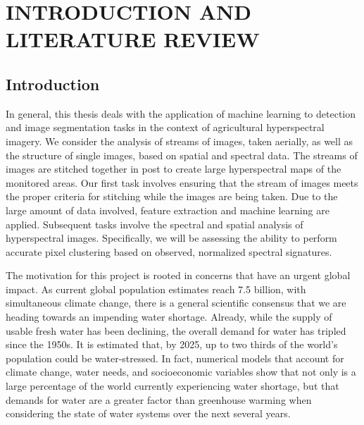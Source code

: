 %
%
%



\pagestyle{plain} %
\setcounter{page}{1}


\chapter{\uppercase {Introduction and Literature Review}}

\section{Introduction}

In general, this thesis deals with the application of machine learning to detection and image segmentation tasks in the context of agricultural hyperspectral imagery.
We consider the analysis of streams of images, taken aerially, as well as the structure of single images, based on spatial and spectral data.
The streams of images are stitched together in post to create large hyperspectral maps of the monitored areas.
Our first task involves ensuring that the stream of images meets the proper criteria for stitching while the images are being taken.
Due to the large amount of data involved, feature extraction and machine learning are applied.
Subsequent tasks involve the spectral and spatial analysis of hyperspectral images.
Specifically, we will be assessing the ability to perform accurate pixel clustering based on observed, normalized spectral signatures.

The motivation for this project is rooted in concerns that have an urgent global impact.
As current global population estimates reach 7.5 billion, with simultaneous climate change, there is a general scientific consensus that we are heading towards an impending water shortage.
Already, while the supply of usable fresh water has been declining, the overall demand for water has tripled since the 1950s.
It is estimated that, by 2025, up to two thirds of the world's population could be water-stressed.
In fact, numerical models that account for climate change, water needs, and socioeconomic variables show that not only is a large percentage of the world currently experiencing water shortage, but that demands for water are a greater factor than greenhouse warming when considering the state of water systems over the next several years.

